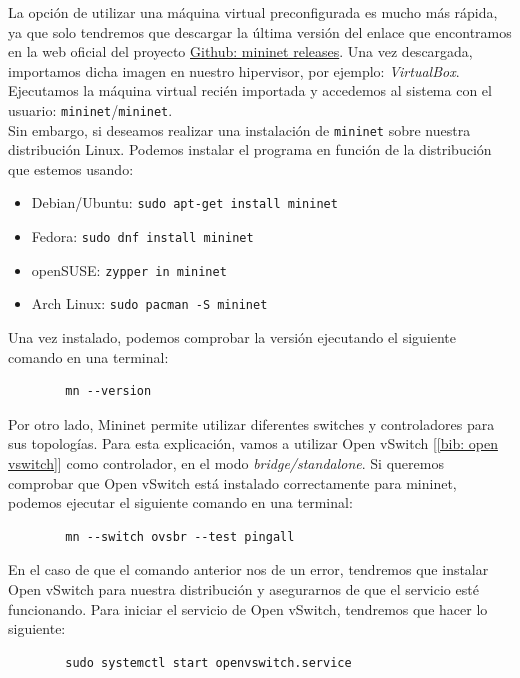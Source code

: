 \documentclass[12pt]{article}
\begin{document}
	\pagebreak

	\noindent La opción de utilizar una máquina virtual preconfigurada es mucho más rápida, ya que solo tendremos que descargar la última versión del enlace que encontramos en la web oficial del proyecto \href{https://github.com/mininet/mininet/releases/}{Github: mininet releases}. Una vez descargada, importamos dicha imagen en nuestro hipervisor, por ejemplo: \textit{VirtualBox}. Ejecutamos la máquina virtual recién importada y accedemos al sistema con el usuario: \texttt{mininet}/\texttt{mininet}. \\
	
	 \noindent Sin embargo, si deseamos realizar una instalación de \texttt{mininet} sobre nuestra distribución Linux. Podemos instalar el programa en función de la distribución que estemos usando:
	
	\begin{itemize}
		\item Debian/Ubuntu: \texttt{sudo apt-get install mininet}
		\item Fedora: \texttt{sudo dnf install mininet}
		\item openSUSE: \texttt{zypper in mininet}
		\item Arch Linux: \texttt{sudo pacman -S mininet}
	\end{itemize}

	\noindent Una vez instalado, podemos comprobar la versión ejecutando el siguiente comando en una terminal:
	\begin{verbatim}
		mn --version
	\end{verbatim}

	\noindent Por otro lado, Mininet permite utilizar diferentes switches y controladores para sus topologías. Para esta explicación, vamos a utilizar Open vSwitch [\ref{bib: open vswitch}] como controlador, en el modo \textit{bridge/standalone}. Si queremos comprobar que Open vSwitch está instalado correctamente para mininet, podemos ejecutar el siguiente comando en una terminal:
	\begin{verbatim}
		mn --switch ovsbr --test pingall
	\end{verbatim}

	\noindent En el caso de que el comando anterior nos de un error, tendremos que instalar Open vSwitch para nuestra distribución y asegurarnos de que el servicio esté funcionando. Para iniciar el servicio de Open vSwitch, tendremos que hacer lo siguiente:
	\begin{verbatim}
		sudo systemctl start openvswitch.service
	\end{verbatim}
\end{document}
